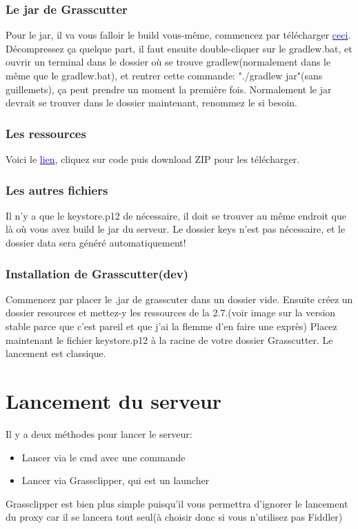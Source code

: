 \documentclass{article}
\begin{document}
\subsubsection{Le jar de Grasscutter}
Pour le jar, il va vous falloir le build vous-même, commencez par télécharger \href{https://github.com/Grasscutters/Grasscutter/archive/refs/heads/development.zip}{\textcolor{blue}{ceci}}.\newline
Décompressez ça quelque part, il faut ensuite double-cliquer sur le gradlew.bat, et ouvrir un terminal dans le dossier où se trouve gradlew(normalement dans le même que le gradlew.bat), et rentrer cette commande: "./gradlew jar"(sans guillemets), ça peut prendre un moment la première fois. Normalement le jar devrait se trouver dans le dossier maintenant, renommez le si besoin.

\subsubsection{Les ressources}
Voici le \href{https://github.com/Koko-boya/Grasscutter_Resources/tree/main}{\textcolor{blue}{lien}}, cliquez sur code puis download ZIP pour les télécharger.\newline

\subsubsection{Les autres fichiers}
Il n'y a que le keystore.p12 de nécessaire, il doit se trouver au même endroit que là où vous avez build le jar du serveur. Le dossier keys n'est pas nécessaire, et le dossier data sera généré automatiquement!

\subsubsection{Installation de Grasscutter(dev)}
Commencez par placer le .jar de grasscuter dans un dossier vide.\newline
Ensuite créez un dossier resources et mettez-y les ressources de la 2.7.(voir image sur la version stable parce que c'est pareil et que j'ai la flemme d'en faire une exprès)\newline
Placez maintenant le fichier keystore.p12 à la racine de votre dossier Grasscutter.	\newline
Le lancement est classique.

\hrulefill

\section{Lancement du serveur}
Il y a deux méthodes pour lancer le serveur:
\begin{itemize}
	\item Lancer via le cmd avec une commande
	\item Lancer via Grassclipper, qui est un launcher
\end{itemize}
Grassclipper est bien plus simple puisqu'il vous permettra d'ignorer le lancement du proxy car il se lancera tout seul(à choisir donc si vous n'utilisez pas Fiddler)
\end{document}
